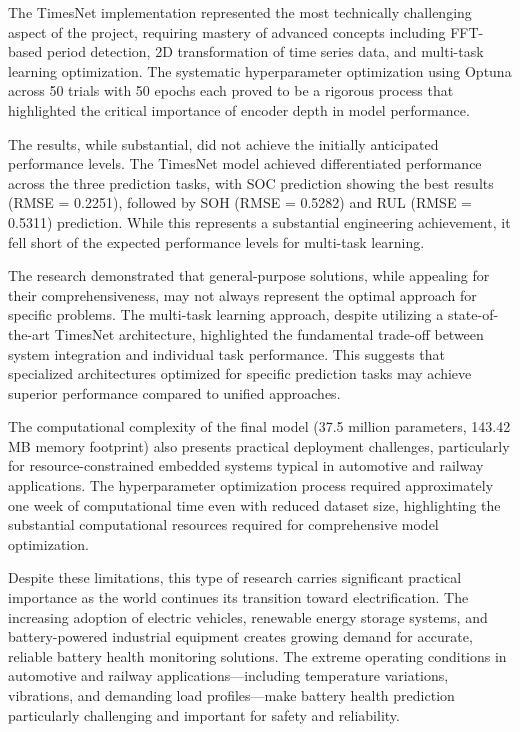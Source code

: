 The TimesNet implementation represented the most technically challenging aspect of the project, requiring mastery of advanced concepts including FFT-based period detection, 2D transformation of time series data, and multi-task learning optimization. The systematic hyperparameter optimization using Optuna across 50 trials with 50 epochs each proved to be a rigorous process that highlighted the critical importance of encoder depth in model performance.

The results, while substantial, did not achieve the initially anticipated performance levels. The TimesNet model achieved differentiated performance across the three prediction tasks, with SOC prediction showing the best results (RMSE = 0.2251), followed by SOH (RMSE = 0.5282) and RUL (RMSE = 0.5311) prediction. While this represents a substantial engineering achievement, it fell short of the expected performance levels for multi-task learning.

The research demonstrated that general-purpose solutions, while appealing for their comprehensiveness, may not always represent the optimal approach for specific problems. The multi-task learning approach, despite utilizing a state-of-the-art TimesNet architecture, highlighted the fundamental trade-off between system integration and individual task performance. This suggests that specialized architectures optimized for specific prediction tasks may achieve superior performance compared to unified approaches.

The computational complexity of the final model (37.5 million parameters, 143.42 MB memory footprint) also presents practical deployment challenges, particularly for resource-constrained embedded systems typical in automotive and railway applications. The hyperparameter optimization process required approximately one week of computational time even with reduced dataset size, highlighting the substantial computational resources required for comprehensive model optimization.

Despite these limitations, this type of research carries significant practical importance as the world continues its transition toward electrification. The increasing adoption of electric vehicles, renewable energy storage systems, and battery-powered industrial equipment creates growing demand for accurate, reliable battery health monitoring solutions. The extreme operating conditions in automotive and railway applications—including temperature variations, vibrations, and demanding load profiles—make battery health prediction particularly challenging and important for safety and reliability.


